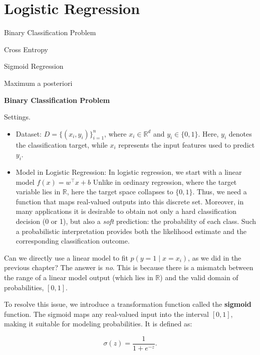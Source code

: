 \documentclass[../main]{subfiles}
\begin{document}
\chapter{Logistic Regression}
\begin{introduction}
\item Binary Classification Problem
\item Cross Entropy
\item Sigmoid Regression
\item Maximum a posteriori
\end{introduction}
\begin{example}
  \textbf{Binary Classification Problem}
\end{example}
Settings.
\begin{itemize}
  \item Dataset: $D=\{(x_i,y_i)\}_{i=1}^n$, where $x_i\in\mathbb{R}^d$ and $y_i\in\{0,1\}$.  
  Here, $y_i$ denotes the classification target, while $x_i$ represents the input features used to predict $y_i$.
  \item Model in Logistic Regression: In logistic regression, we start with a linear model $
  f(x) = w^\top x + b$
  Unlike in ordinary regression, where the target variable lies in $\mathbb{R}$, here the target space collapses to $\{0,1\}$. Thus, we need a function that maps real-valued outputs into this discrete set. Moreover, in many applications it is desirable to obtain not only a hard classification decision (0 or 1), but also a \emph{soft} prediction: the probability of each class. Such a probabilistic interpretation provides both the likelihood estimate and the corresponding classification outcome.
\end{itemize}
Can we directly use a linear model to fit $p(y=1 \mid x=x_i)$, as we did in the previous chapter? The answer is \emph{no}. This is because there is a mismatch between the range of a linear model output (which lies in $\mathbb{R}$) and the valid domain of probabilities, $[0,1]$. 

To resolve this issue, we introduce a transformation function called the \textbf{sigmoid} function. The sigmoid maps any real-valued input into the interval $[0,1]$, making it suitable for modeling probabilities. It is defined as:
\begin{definition}
  \begin{equation}
    \sigma(z) = \frac{1}{1 + e^{-z}} .
\end{equation}
\end{definition}
\end{document}
